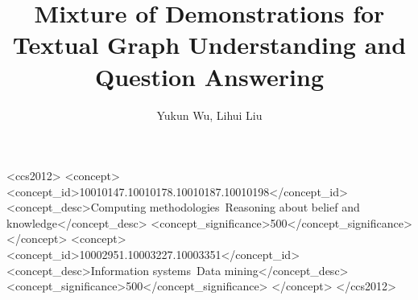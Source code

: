 \documentclass[sigconf,preprint]{acmart}
\begin{document}
\title{Mixture of Demonstrations for Textual Graph Understanding and Question Answering}


\author{Yukun Wu, Lihui Liu}









\begin{abstract}

\end{abstract}


\begin{CCSXML}
<ccs2012>
<concept>
<concept_id>10010147.10010178.10010187.10010198</concept_id>
<concept_desc>Computing methodologies~Reasoning about belief and knowledge</concept_desc>
<concept_significance>500</concept_significance>
</concept>
<concept>
<concept_id>10002951.10003227.10003351</concept_id>
<concept_desc>Information systems~Data mining</concept_desc>
<concept_significance>500</concept_significance>
</concept>
</ccs2012>
\vspace{-2\baselineskip}
\end{CCSXML}




\end{document}
